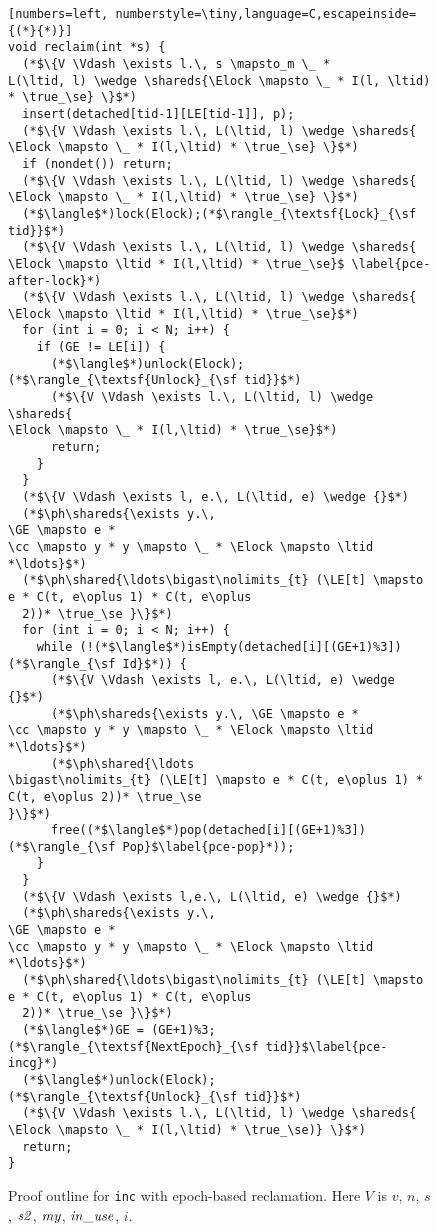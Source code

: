 \begin{figure}
{\figfontsize
\begin{lstlisting}[numbers=left, numberstyle=\tiny,language=C,escapeinside={(*}{*)}] 
void reclaim(int *s) {
  (*$\{V \Vdash \exists l.\, s \mapsto_m \_ *
L(\ltid, l) \wedge \shareds{\Elock \mapsto \_ * I(l, \ltid) * \true_\se} \}$*)
  insert(detached[tid-1][LE[tid-1]], p);
  (*$\{V \Vdash \exists l.\, L(\ltid, l) \wedge \shareds{
\Elock \mapsto \_ * I(l,\ltid) * \true_\se} \}$*)
  if (nondet()) return;
  (*$\{V \Vdash \exists l.\, L(\ltid, l) \wedge \shareds{
\Elock \mapsto \_ * I(l,\ltid) * \true_\se} \}$*)
  (*$\langle$*)lock(Elock);(*$\rangle_{\textsf{Lock}_{\sf tid}}$*)
  (*$\{V \Vdash \exists l.\, L(\ltid, l) \wedge \shareds{
\Elock \mapsto \ltid * I(l,\ltid) * \true_\se}$ \label{pce-after-lock}*)
  (*$\{V \Vdash \exists l.\, L(\ltid, l) \wedge \shareds{
\Elock \mapsto \ltid * I(l,\ltid) * \true_\se}$*)
  for (int i = 0; i < N; i++) {
    if (GE != LE[i]) {
      (*$\langle$*)unlock(Elock);(*$\rangle_{\textsf{Unlock}_{\sf tid}}$*)
      (*$\{V \Vdash \exists l.\, L(\ltid, l) \wedge \shareds{
\Elock \mapsto \_ * I(l,\ltid) * \true_\se}$*)
      return;
    }
  }
  (*$\{V \Vdash \exists l, e.\, L(\ltid, e) \wedge {}$*)
  (*$\ph\shareds{\exists y.\, 
\GE \mapsto e * 
\cc \mapsto y * y \mapsto \_ * \Elock \mapsto \ltid *\ldots}$*)
  (*$\ph\shared{\ldots\bigast\nolimits_{t} (\LE[t] \mapsto e * C(t, e\oplus 1) * C(t, e\oplus
  2))* \true_\se }\}$*)
  for (int i = 0; i < N; i++) {
    while (!(*$\langle$*)isEmpty(detached[i][(GE+1)%3])(*$\rangle_{\sf Id}$*)) {
      (*$\{V \Vdash \exists l, e.\, L(\ltid, e) \wedge {}$*)
      (*$\ph\shareds{\exists y.\, \GE \mapsto e * 
\cc \mapsto y * y \mapsto \_ * \Elock \mapsto \ltid *\ldots}$*)
      (*$\ph\shared{\ldots 
\bigast\nolimits_{t} (\LE[t] \mapsto e * C(t, e\oplus 1) * C(t, e\oplus 2))* \true_\se
}\}$*)
      free((*$\langle$*)pop(detached[i][(GE+1)%3])(*$\rangle_{\sf Pop}$\label{pce-pop}*));
    }
  }
  (*$\{V \Vdash \exists l,e.\, L(\ltid, e) \wedge {}$*)
  (*$\ph\shareds{\exists y.\, 
\GE \mapsto e * 
\cc \mapsto y * y \mapsto \_ * \Elock \mapsto \ltid *\ldots}$*)
  (*$\ph\shared{\ldots\bigast\nolimits_{t} (\LE[t] \mapsto e * C(t, e\oplus 1) * C(t, e\oplus
  2))* \true_\se }\}$*)
  (*$\langle$*)GE = (GE+1)%3;(*$\rangle_{\textsf{NextEpoch}_{\sf tid}}$\label{pce-incg}*)
  (*$\langle$*)unlock(Elock);(*$\rangle_{\textsf{Unlock}_{\sf tid}}$*)
  (*$\{V \Vdash \exists l.\, L(\ltid, l) \wedge \shareds{
\Elock \mapsto \_ * I(l,\ltid) * \true_\se)} \}$*)
  return;
}
\end{lstlisting}
}
\caption{\small Proof outline for {\tt inc} with epoch-based reclamation.  Here
$V$ is $v$, $n$, $s$, ${\it s2}$, ${\it my}$, ${\it in\_use}$, $i$.}
\label{fig:epoch2}
\end{figure}

